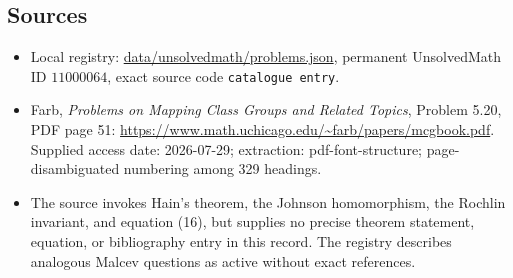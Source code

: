 \documentclass[11pt]{article}
\begin{document}
\subsection{Sources}
\begin{itemize}
\item Local registry: \url{data/unsolvedmath/problems.json}, permanent UnsolvedMath ID $11000064$, exact source code \texttt{catalogue entry}.
\item Farb, \emph{Problems on Mapping Class Groups and Related Topics}, Problem 5.20, PDF page 51: \url{https://www.math.uchicago.edu/~farb/papers/mcgbook.pdf}. Supplied access date: 2026-07-29; extraction: pdf-font-structure; page-disambiguated numbering among 329 headings.
\item The source invokes Hain's theorem, the Johnson homomorphism, the Rochlin invariant, and equation (16), but supplies no precise theorem statement, equation, or bibliography entry in this record. The registry describes analogous Malcev questions as active without exact references.
\end{itemize}
\end{document}
